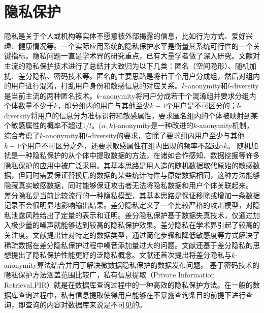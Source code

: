 \section{隐私保护}\label{sec:location-privacy}

隐私是关于个人或机构等实体不愿意被外部揭露的信息，比如行为方式、爱好兴趣、健康情况等。一个实际应用系统的隐私保护水平是衡量其系统可行性的一个关键指标。隐私问题一直是学术界的研究重点，已有大量学者做了深入研究。文献\cite{wang2014location}对主流的隐私保护技术进行了总结并大致归为以下几类：匿名（空间隐形）、随机加扰、差分隐私、密码技术等。匿名的主要思路是将若干个用户分成组，然后对组内的用户进行混淆，打乱用户身份和敏感信息的对应关系。$k$-anonymity\cite{sweeney2002k}和$l$-diversity\cite{machanavajjhala2007diversity}是当前主流的两种匿名技术。$k$-anonymity将用户分成若干个混淆组并要求分组内个体数量不少于$k$，即分组内的用户与其他至少$k-1$个用户是不可区分的；$l$-diversity将用户的信息分为准标识符和敏感属性，要求匿名组内的个体被映射到某个敏感属性的概率不超过$1/l$。($\alpha,k$)-anonymity\cite{wong2006alpha}是一种改进的$k$-anonymity机制，综合考虑了$k$-anonymity和$l$-diversity的要求，它除了要求组内用户至少与其他$k-1$个用户不可区分之外，还要求敏感属性在组内出现的频率不超过$\alpha k$。
随机加扰\cite{adam1989security}是一种隐私保护的从个体中提取数据的方法，在诸如合作感知\cite{liu2012cloud}、数据挖掘\cite{du2003using}等许多隐私保护的应用中被广泛采用。其基本思路是用人造的随机数据取代原始的敏感数据，但同时需要保证替换后的数据的某些统计特性与原始数据相同，这种方法能够隐藏真实敏感数据，同时能够保证攻击者无法将隐私数据和用户个体关联起来。
差分隐私\cite{dwork2006differential}是当前比较流行的一种隐私模型，其基本思路是保证移除或增加一条数据记录不会很明显地影响输出结果。差分隐私定义了一个比较严格的攻击模型，对隐私泄露风险给出了定量的表示和证明。差分隐私保护基于数据失真技术，仅通过加入极少量的噪声就能够达到较高的隐私保护效果。差分隐私在学术界引起了较高的关注度。文献\cite{cormode2011differentially}提出针对特定的数据类型，通过简化步骤和降低敏感度等方式解决了稀疏数据在差分隐私保护过程中噪音添加量过大的问题。文献\cite{dwork2010differential}还基于差分隐私的思想提出了隐私保护性能更好的泛隐私概念。文献\cite{li2011provably}还首次提出将差分隐私与$k$-anonymity算法结合并用于解决微数据隐私保护的数据发布问题。
基于密码技术的隐私保护方法涵盖范围比较广，私有信息提取（Private Information Retrieval,PIR）\cite{chor1998private}就是在数据库查询过程中的一种高效的隐私保护方法。在一般的数据库查询过程中，私有信息提取使得用户能够在不暴露查询条目的前提下进行查询，即查询的内容对数据库来说是不可见的。


